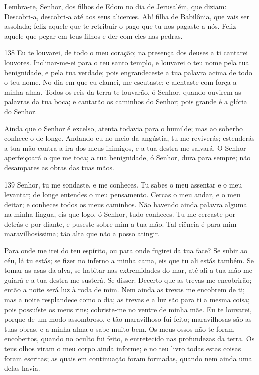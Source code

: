 Lembra-te, Senhor, dos filhos de Edom no dia de Jerusalém, que
diziam: Descobri-a, descobri-a até aos seus alicerces. Ah! filha
de Babilônia, que vais ser assolada; feliz aquele que te retribuir o
pago que tu nos pagaste a nós. Feliz aquele que pegar em teus
filhos e der com eles nas pedras.

\bigskip

\lettrine{138}{} Eu te louvarei, de todo o meu coração; na
presença dos deuses a ti cantarei louvores. Inclinar-me-ei para
o teu santo templo, e louvarei o teu nome pela tua benignidade, e
pela tua verdade; pois engrandeceste a tua palavra acima de todo o
teu nome. No dia em que eu clamei, me escutaste; e alentaste com
força a minha alma. Todos os reis da terra te louvarão, ó
Senhor, quando ouvirem as palavras da tua boca; e cantarão os
caminhos do Senhor; pois grande é a glória do Senhor.

Ainda que o Senhor é excelso, atenta todavia para o humilde; mas
ao soberbo conhece-o de longe. Andando eu no meio da angústia,
tu me reviverás; estenderás a tua mão contra a ira dos meus
inimigos, e a tua destra me salvará. O Senhor aperfeiçoará o que
me toca; a tua benignidade, ó Senhor, dura para sempre; não
desampares as obras das tuas mãos.

\bigskip

\lettrine{139}{} Senhor, tu me sondaste, e me conheces. Tu
sabes o meu assentar e o meu levantar; de longe entendes o meu
pensamento. Cercas o meu andar, e o meu deitar; e conheces todos
os meus caminhos. Não havendo ainda palavra alguma na minha
língua, eis que logo, ó Senhor, tudo conheces. Tu me cercaste
por detrás e por diante, e puseste sobre mim a tua mão. Tal
ciência é para mim maravilhosíssima; tão alta que não a posso
atingir.

Para onde me irei do teu espírito, ou para onde fugirei da tua
face? Se subir ao céu, lá tu estás; se fizer no inferno a minha
cama, eis que tu ali estás também. Se tomar as asas da alva, se
habitar nas extremidades do mar, até ali a tua mão me guiará
e a tua destra me susterá. Se disser: Decerto que as trevas
me encobrirão; então a noite será luz à roda de mim. Nem
ainda as trevas me encobrem de ti; mas a noite resplandece como o
dia; as trevas e a luz são para ti a mesma coisa; pois
possuíste os meus rins; cobriste-me no ventre de minha mãe.
Eu te louvarei, porque de um modo assombroso, e tão
maravilhoso fui feito; maravilhosas são as tuas obras, e a minha
alma o sabe muito bem. Os meus ossos não te foram encobertos,
quando no oculto fui feito, e entretecido nas profundezas da terra.
Os teus olhos viram o meu corpo ainda informe; e no teu livro
todas estas coisas foram escritas; as quais em continuação foram
formadas, quando nem ainda uma delas havia.


